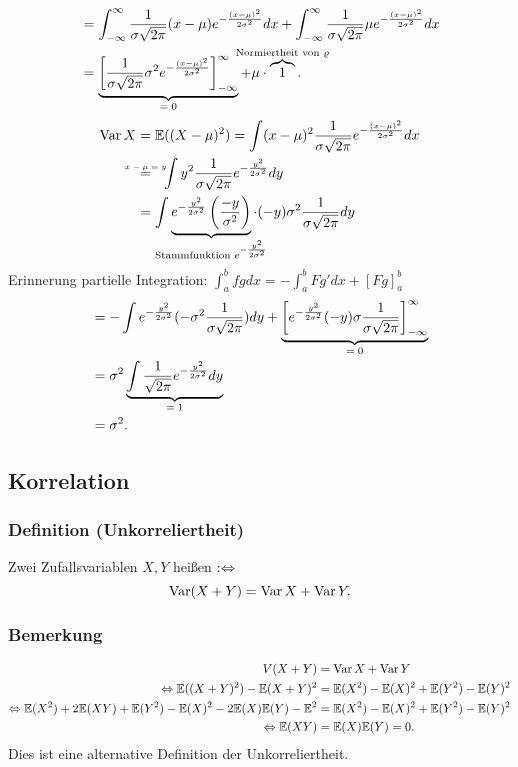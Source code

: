 {\begin{align*}
&=\int_{-\infty}^{\infty}\frac{1}{\sigma\sqrt{2\pi}}(x-\mu)e^{-\frac{(x-\mu)^2}{2\sigma^2}}dx
+\int_{-\infty}^{\infty}\frac{1}{\sigma\sqrt{2\pi}}\mu e^{-\frac{(x-\mu)^2}{2\sigma^2}}dx\\
&=\ubr{\left[\frac{1}{\sigma\sqrt{2\pi}}\sigma^2e^{-\frac{(x-\mu)^2}{2\sigma^2}}\right]_{-\infty}^\infty}{$=0$}
+\mu\cdot\obr{1}{Normiertheit von $\varrho$}.
\end{align*}
\begin{align*}
\Var X&=\mathbb{E}((X-\mu)^2)=\int(x-\mu)^2\frac{1}{\sigma\sqrt{2\pi}}e^{-\frac{(x-\mu)^2}{2\sigma^2}}dx\\
&\textabove{$x-\mu=y$}{=}\ \ \int y^2\frac{1}{\sigma\sqrt{2\pi}}e^{-\frac{y^2}{2\sigma^2}}dy\\
&=\int \ubr{e^{-\frac{y^2}{2\sigma^2}}\left(\frac{-y}{\sigma^2}\right)}{Stammfunktion $e^{-\frac{y^2}{2\sigma^2}}$}\cdot(-y)\sigma^2\frac{1}{\sigma\sqrt{2\pi}}dy\\
\end{align*}
Erinnerung partielle Integration: $\int_a^bfgdx=-\int_a^bFg'dx+[Fg]_a^b$
\begin{align*}
&=-\int e^{-\frac{y^2}{2\sigma^2}}(-\sigma^2\frac{1}{\sigma\sqrt{2\pi}})dy
+\ubr{\left[e^{-\frac{y^2}{2\sigma^2}}(-y)\sigma\frac{1}{\sigma\sqrt{2\pi}}\right]_{-\infty}^\infty}{$=0$}\\
&=\sigma^2\ubr{\int\frac{1}{\sqrt{2\pi}}e^{-\frac{y^2}{2\sigma^2}}dy}{$=1$}\\
&=\sigma^2.
\end{align*}
}
\subsection{Korrelation}
\subsubsection{Definition (Unkorreliertheit)}
Zwei Zufallsvariablen $X,Y$ hei\ss{}en  $:\Leftrightarrow$
\[
\operatorname{Var}(X+Y)=\operatorname{Var} X+\operatorname{Var} Y.
\]
\subsubsection{Bemerkung}
\begin{align*}
V(X+Y)&=\operatorname{Var} X+\operatorname{Var} Y\\
\Leftrightarrow\mathbb{E}((X+Y)^2)-\mathbb{E}(X+Y)^2&=\mathbb{E}(X^2)-\mathbb{E}(X)^2+\mathbb{E}(Y^2)-\mathbb{E}(Y)^2\\
\Leftrightarrow\mathbb{E}(X^2)+2\mathbb{E}(XY)+\mathbb{E}(Y^2)-\mathbb{E}(X)^2-2\mathbb{E}(X)\mathbb{E}(Y)-\mathbb{E}^2&=\mathbb{E}(X^2)-\mathbb{E}(X)^2+\mathbb{E}(Y^2)-\mathbb{E}(Y)^2\\
\Leftrightarrow\mathbb{E}(XY)&=\mathbb{E}(X)\mathbb{E}(Y)=0.
\end{align*}
Dies ist eine alternative Definition der Unkorreliertheit.
